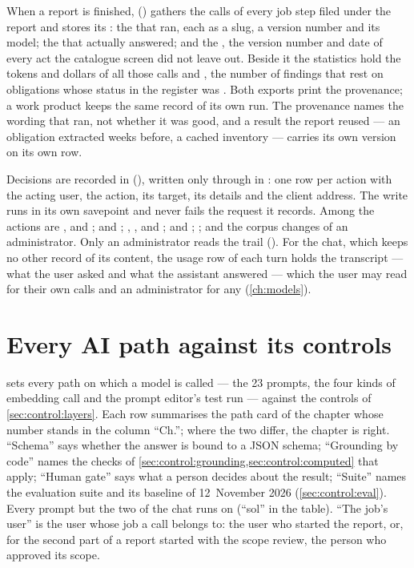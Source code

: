 When a report is finished,  () gathers the
calls of every job step filed under the report and stores its : the
 that ran, each as a slug, a version number and its model; the 
that actually answered; and the , the version number and date of every act the
catalogue screen did not leave out. Beside it the statistics hold the tokens and dollars of
all those calls and , the number of findings that rest on
obligations whose status in the register was . Both exports print the provenance; a work product keeps the
same record of its own run. The provenance names the wording that ran, not whether it was
good, and a result the report reused --- an obligation extracted weeks before, a cached
inventory --- carries its own version on its own row.

Decisions are recorded in  (), written only through
 in : one row per action with the acting user, the action, its
target, its details and the client address. The write runs in its own savepoint and never
fails the request it records. Among the actions are ,
 and ;  and
; , ,
 and ;  and
; ; and the corpus changes of an administrator.
Only an administrator reads the trail (). For the chat, which keeps no
other record of its content, the usage row of each turn holds the transcript --- what the
user asked and what the assistant answered --- which the user may read for their own calls
and an administrator for any (\cref{ch:models}).


\section{Every AI path against its controls}\label{sec:control:matrix}

 sets every path on which a model is called --- the 23 prompts, the
four kinds of embedding call and the prompt editor's test run --- against the controls of
\cref{sec:control:layers}. Each row summarises the path card of the chapter whose number
stands in the column \enquote{Ch.}; where the two differ, the chapter is right. \enquote{Schema} says whether the answer is bound to a
JSON schema; \enquote{Grounding by code} names the checks of
\cref{sec:control:grounding,sec:control:computed} that apply; \enquote{Human gate} says what a
person decides about the result; \enquote{Suite} names the evaluation suite and its baseline
of 12~November 2026 (\cref{sec:control:eval}). Every prompt but the two of the chat runs on
 (\enquote{sol} in the table). \enquote{The job's user} is the user whose
job a call belongs to: the user who started the report, or, for the second part of a report
started with the scope review, the person who approved its scope.

